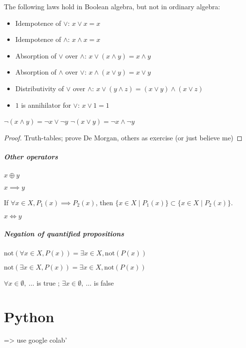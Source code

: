 \begin{property}
	The following laws hold in Boolean algebra, but not in ordinary algebra: 
	\begin{itemize}
		\item Idempotence of $\lor$: $x \lor x = x$
		\item Idempotence of $\land$: $x \land x = x$
		\item Absorption of $\lor$ over $\land$: $x \lor (x \land y)  = x \land y$
		\item Absorption of $\land$ over $\lor$: $x \land (x \lor y)  = x \lor y$
		\item Distributivity of $\lor$ over $\land$:  $x \lor (y \land z) = (x \lor y) \land (x \lor z)$
		\item $1$ is annihilator for $\lor$: $x \lor 1 = 1$
	\end{itemize}
\end{property}
\begin{property}
	$\lnot (x \land y) = \lnot x \lor \lnot y$
	$\lnot (x \lor y) = \lnot x \land \lnot y$
\end{property}
\begin{proof}
	Truth-tables; prove De Morgan, others as exercise (or just believe me)
\end{proof}

\subparagraph{Other operators}
\begin{definition}[Exclusive Or]
	$x \oplus y$
\end{definition}
\begin{definition}[Implication]
	$x \implies y$
\end{definition}
\begin{property}
	If $\forall x \in X, P_1(x) \implies P_2(x)$, then $\{ x \in X \mid P_1(x) \} \subset \{ x \in X \mid P_2(x) \}$.
\end{property}
\begin{definition}
	$x \iff y$
\end{definition}

\subparagraph{Negation of quantified propositions}
\begin{property}
	$\mathrm{not}(\forall x\in X, P(x)) = \exists x\in X, \mathrm{not}(P(x))$
\end{property}
\begin{property}
	$\mathrm{not}(\exists x\in X, P(x)) = \exists x\in X, \mathrm{not}(P(x))$
\end{property}
\begin{notation}
	$\forall x \in \emptyset, \ \dots$ is true ;
	$\exists x \in \emptyset, \ \dots$ is false
\end{notation}



\section{Python}

=> use google colab'

